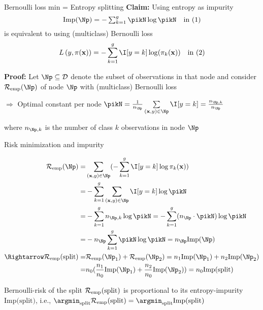 \documentclass[11pt,compress,t,notes=noshow, xcolor=table]{beamer}
\begin{document}
\begin{frame}{Bernoulli loss min = Entropy splitting}
\textbf{Claim:} Using entropy as impurity
$$\text{Imp}(\Np) = -\textstyle\sum_{k = 1}^g \pikN \log \pikN \quad \text{in (1)}$$
is equivalent to using (multiclass) Bernoulli loss
$$\Lpixy = -\sum_{k = 1}^g \I [y=k] \log (\pi_k(\xv)) \quad \text{in (2)}$$  %


\textbf{Proof:} %
Let $\Np \subseteq \D$ denote the subset of observations in that node and consider $\riske(\Np)$ of node $\Np$ with (multiclass) Bernoulli loss  

\vfill

$\Rightarrow$ Optimal constant per node $\pikN = \frac{1}{n_{\Np}} \sum\limits_{(\xv,y) \in \Np} \I [y=k] = \frac{n_{\Np,k}}{n_{\Np }}$\\

\vfill

where $n_{\Np,k}$ is the number of class $k$ observations in node $\Np$ \\


\end{frame}


\begin{frame2}[small]{Risk minimization and impurity}

\begin{align*}
\riske(\Np) =& \sum_{\xy \in \Np} (- \sum_{k = 1}^g \I [y=k] \log \pi_k(\xv) ) \\
=& -\sum_{k = 1}^g \sum_{\xy \in \Np} \I [y=k]\log \pikN \\
=& -\sum_{k = 1}^g n_{\Np,k} \log \pikN = -\sum_{k = 1}^g (n_\Np \cdot \pikN) \log \pikN  %
\\
=& -n_{\Np} \sum_{k = 1}^g \pikN \log \pikN = n_\Np \text{Imp}(\Np)\\
\Rightarrow \riske(\text{split}) =& \riske(\Np_1) + \riske(\Np_2)  = n_1 \text{Imp}(\Np_1) + n_2 \text{Imp}(\Np_2)\\
=&n_0 (\frac{n_1}{n_0} \text{Imp}(\Np_1) + \frac{n_2}{n_0} \text{Imp}(\Np_2)) = n_0\text{Imp(split)}\\
\end{align*} 

Bernoulli-risk of the split $\mathcal{R}_{\text{emp}}(\text{split})$ is proportional to its entropy-impurity $\text{Imp(split)}$, i.e., $\argmin_\text{split} \riske(\text{split}) = \argmin_\text{split} \text{Imp(split)}$ \\

\end{frame2}
\end{document}
